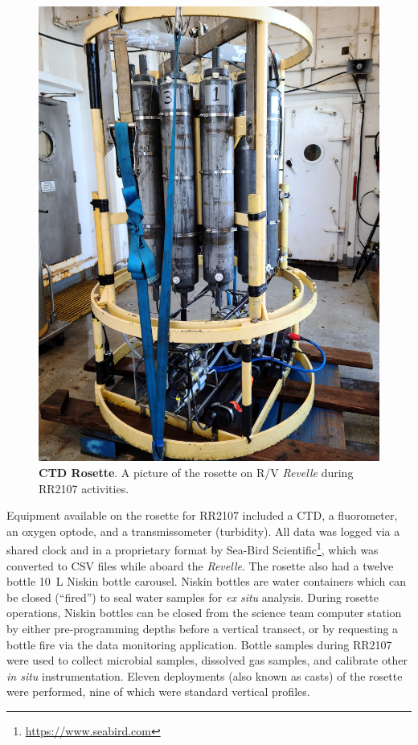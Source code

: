 \begin{figure}[h!]
  \centering
  \includegraphics[width=0.8\columnwidth, angle=-90]{figures/ops_rosette.jpg}
  \caption[CTD Rosette.]{\textbf{CTD Rosette}. A picture of the rosette on R/V \emph{Revelle} during RR2107 activities.}
  \label{fig:ops_rosette}
\end{figure}


Equipment available on the rosette for RR2107 included a CTD, a fluorometer, an oxygen optode, and a transmissometer (turbidity). All data was logged via a shared clock and in a proprietary format by Sea-Bird Scientific\footnote{\url{https://www.seabird.com}}, which was converted to CSV files while aboard the \emph{Revelle}. The rosette also had a twelve bottle \SI{10}{\liter} Niskin bottle carousel. Niskin bottles are water containers which can be closed (``fired'') to seal water samples for \emph{ex situ} analysis. During rosette operations, Niskin bottles can be closed from the science team computer station by either pre-programming depths before a vertical transect, or by requesting a bottle fire via the data monitoring application. Bottle samples during RR2107 were used to collect microbial samples, dissolved gas samples, and calibrate other \emph{in situ} instrumentation. Eleven deployments (also known as casts) of the rosette were performed, nine of which were standard vertical profiles. 

